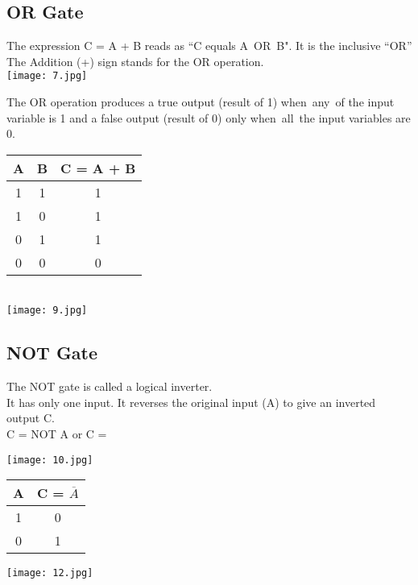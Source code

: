 \documentclass[10pt,a4paper,onecolumn]{article}
\begin{document}
\subsection{OR Gate}
The expression C = A + B reads as “C equals A OR B". It is the inclusive “OR”
The Addition (+) sign stands for the OR operation. \\
\texttt{[image: 7.jpg]}

The OR operation produces a true output (result of 1) when any of the input variable is 1 and a false output (result of 0) only when all the input variables are 0. \\
\begin{table}[h!]
	\begin{center}
		\begin{tabular}{c|c|c}
			\textbf{A} & \textbf{B} &
			\textbf{C = A + B}\\
			\hline
			1 & 1 & 1\\
			\hline
			1 & 0 & 1\\
			\hline
			0 & 1 & 1\\
			\hline
			0 & 0 & 0\\
			\hline
		\end{tabular}
	\end{center}
\end{table} \\ 
\texttt{[image: 9.jpg]}

\subsection{NOT Gate}
The NOT gate is called a logical inverter. \\
It has only one input. It reverses the original input (A) to give an inverted output C. \\

\color{red}C = NOT A or C = \\ \color{black}

\texttt{[image: 10.jpg]}

\begin{table}[h!]
	\begin{center}
		\begin{tabular}{c|c}
			\textbf{A} & 
			\textbf{C = $\overline{A}$}\\
			\hline
			1 & 0 \\
			\hline
			0 & 1 \\
			\hline
		\end{tabular}
	\end{center}
\end{table} 
\texttt{[image: 12.jpg]}
\end{document}
